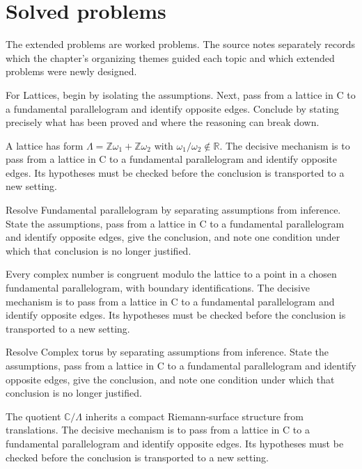 \section{Solved problems}
The extended problems are worked problems. The source notes separately records which the chapter's organizing themes guided each topic and which extended problems were newly designed.

\begin{problem}\label{prob:iv27-problem-01}
For Lattices, begin by isolating the assumptions. Next, pass from a lattice in C to a fundamental parallelogram and identify opposite edges. Conclude by stating precisely what has been proved and where the reasoning can break down.
\end{problem}
\begin{solution}
A lattice has form $\Lambda=\mathbb Z\omega_1+\mathbb Z\omega_2$ with $\omega_1/\omega_2\notin\mathbb R$. The decisive mechanism is to pass from a lattice in C to a fundamental parallelogram and identify opposite edges. Its hypotheses must be checked before the conclusion is transported to a new setting.
\end{solution}

\begin{problem}\label{prob:iv27-problem-02}
Resolve Fundamental parallelogram by separating assumptions from inference. State the assumptions, pass from a lattice in C to a fundamental parallelogram and identify opposite edges, give the conclusion, and note one condition under which that conclusion is no longer justified.
\end{problem}
\begin{solution}
Every complex number is congruent modulo the lattice to a point in a chosen fundamental parallelogram, with boundary identifications. The decisive mechanism is to pass from a lattice in C to a fundamental parallelogram and identify opposite edges. Its hypotheses must be checked before the conclusion is transported to a new setting.
\end{solution}

\begin{problem}\label{prob:iv27-problem-03}
Resolve Complex torus by separating assumptions from inference. State the assumptions, pass from a lattice in C to a fundamental parallelogram and identify opposite edges, give the conclusion, and note one condition under which that conclusion is no longer justified.
\end{problem}
\begin{solution}
The quotient $\mathbb C/\Lambda$ inherits a compact Riemann-surface structure from translations. The decisive mechanism is to pass from a lattice in C to a fundamental parallelogram and identify opposite edges. Its hypotheses must be checked before the conclusion is transported to a new setting.
\end{solution}

